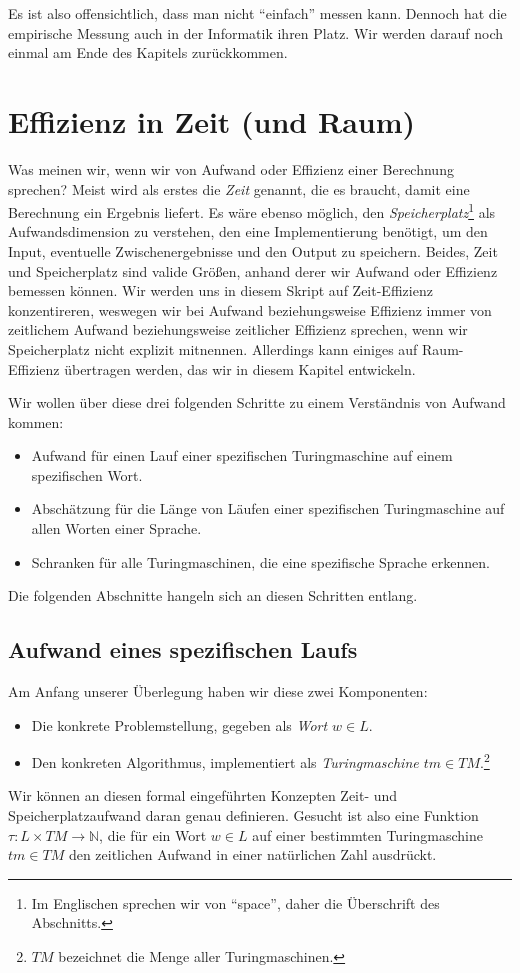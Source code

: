 Es ist also offensichtlich,
dass man nicht ``einfach'' messen kann.
Dennoch hat die empirische Messung auch in der Informatik ihren Platz.
Wir werden darauf noch einmal am Ende des Kapitels zurückkommen.

\section{Effizienz in Zeit (und Raum)}

Was meinen wir, wenn wir von Aufwand oder Effizienz einer Berechnung sprechen?
Meist wird als erstes die \emph{Zeit} genannt,
die es braucht,
damit eine Berechnung ein Ergebnis liefert.
Es wäre ebenso möglich,
den \emph{Speicherplatz}\footnote{
    Im Englischen sprechen wir von ``space'', daher die Überschrift des Abschnitts.}
als Aufwandsdimension zu verstehen,
den eine Implementierung benötigt,
um den Input,
eventuelle Zwischenergebnisse
und den Output zu speichern.
Beides, Zeit und Speicherplatz sind valide Größen,
anhand derer wir Aufwand oder Effizienz bemessen können.
Wir werden uns in diesem Skript auf Zeit-Effizienz konzentireren,
weswegen wir bei Aufwand beziehungsweise Effizienz immer von
zeitlichem Aufwand beziehungsweise zeitlicher Effizienz sprechen,
wenn wir Speicherplatz nicht explizit mitnennen.
Allerdings kann einiges auf Raum-Effizienz übertragen werden,
das wir in diesem Kapitel entwickeln.

Wir wollen über diese drei folgenden Schritte zu einem Verständnis von Aufwand kommen:
\begin{itemize}
    \item Aufwand für einen Lauf einer spezifischen Turingmaschine auf einem spezifischen Wort.
    \item Abschätzung für die Länge von Läufen einer spezifischen Turingmaschine
        auf allen Worten einer Sprache.
    \item Schranken für alle Turingmaschinen, die eine spezifische Sprache erkennen.
\end{itemize}

Die folgenden Abschnitte hangeln sich an diesen Schritten entlang.

\subsection{Aufwand eines spezifischen Laufs}
Am Anfang unserer Überlegung haben wir diese zwei Komponenten:
\begin{itemize}
    \item Die konkrete Problemstellung, gegeben als \emph{Wort $w \in L$}.
    \item Den konkreten Algorithmus,
        implementiert als \emph{Turingmaschine $tm \in TM$}.\footnote{
            $TM$ bezeichnet die Menge aller Turingmaschinen.}
\end{itemize}
Wir können an diesen formal eingeführten Konzepten
Zeit- und Speicherplatzaufwand daran genau definieren.
Gesucht ist also eine Funktion $\tau: L \times TM \rightarrow \mathbb{N}$,
die für ein Wort $w \in L$ auf einer bestimmten Turingmaschine $tm \in TM$
den zeitlichen Aufwand in einer natürlichen Zahl ausdrückt.

